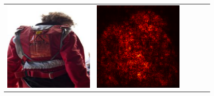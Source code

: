 \documentclass[preprint,12pt]{elsarticle}
\begin{document}
\begin{figure}[p]
\begin{tabular}{cccccc}
  \includegraphics[scale=\scale]{../visualizations/examples/imagenette/resnet18/images/8.png} &
  \includegraphics[scale=\scale]{../visualizations/examples/imagenette/resnet18/saliency_map/8.png} & 

\end{tabular}
\end{figure}
\end{document}
